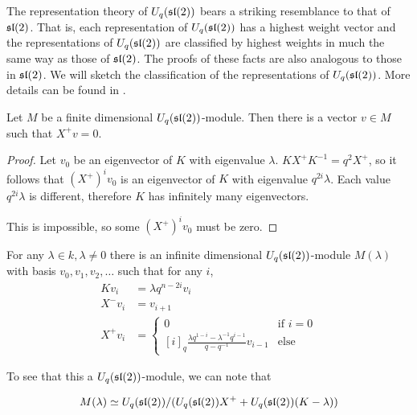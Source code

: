 The representation theory of $U_q(\mathfrak{sl}(2))$ bears a striking resemblance to
that of $\mathfrak{sl}(2)$. That is, each representation of $U_q(\mathfrak{sl}(2))$ has a highest
weight vector and the representations of $U_q(\mathfrak{sl}(2))$ are classified by
highest weights in much the same way as those of $\mathfrak{sl}(2)$. The proofs of these
facts are also analogous to those in $\mathfrak{sl}(2)$. We will sketch the
classification of the representations of $U_q(\mathfrak{sl}(2))$. More details can be
found in \cite{Jantzen1995}.


\begin{claim}
    Let $M$ be a finite dimensional $U_q(\mathfrak{sl}(2))$-module. Then there is a
    vector $v \in M$ such that $ X^+ v = 0$. 
\end{claim}


\begin{proof}
    Let $v_0$ be an eigenvector of $K$ with eigenvalue $\lambda$. $K X^+ K^{-1} =
    q^2  X^+$, so it follows that $(X^+)^i v_0$ is an eigenvector of $K$ with
    eigenvalue $q^{2i}\lambda$. Each value $q^{2i}\lambda$ is different,
    therefore $K$ has infinitely many eigenvectors. 

    This is impossible, so some $(X^+)^i v_0$ must be zero.
\end{proof}

For any $\lambda \in k, \lambda \neq 0$ there is an infinite dimensional
$U_q(\mathfrak{sl}(2))$-module $M(\lambda)$ with basis $v_0, v_1, v_2, \ldots$ such that
for any $i$,
\begin{align}
    Kv_i &= \lambda q^{n-2i}v_i \\
    X^-v_i &= v_{i+1} \\
     X^+ v_i &= \begin{cases} 0 & \text{if $i = 0$} \\
                          [i]_q \frac{\lambda q^{1-i} - \lambda^{-1}q^{i-1}}{q - q^{-1}}v_{i-1} & \text{else}
            \end{cases}
\end{align}

To see that this a $U_q(\mathfrak{sl}(2))$-module, we can note that 

\begin{equation}
    M(\lambda) \simeq U_q(\mathfrak{sl}(2))/(U_q(\mathfrak{sl}(2)) X^+  + U_q(\mathfrak{sl}(2))(K-\lambda))
\end{equation}

